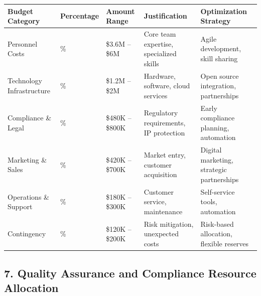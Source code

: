 \documentclass[
  letterpaper,
  DIV=11,
  numbers=noendperiod]{scrartcl}
\begin{document}
\begin{longtable}[]{@{}
  >{\raggedright\arraybackslash}p{}
  >{\raggedright\arraybackslash}p{}
  >{\raggedright\arraybackslash}p{}
  >{\raggedright\arraybackslash}p{}
  >{\raggedright\arraybackslash}p{}@{}}
\toprule\noalign{}
\begin{minipage}[b]{\linewidth}\raggedright
Budget Category
\end{minipage} & \begin{minipage}[b]{\linewidth}\raggedright
Percentage
\end{minipage} & \begin{minipage}[b]{\linewidth}\raggedright
Amount Range
\end{minipage} & \begin{minipage}[b]{\linewidth}\raggedright
Justification
\end{minipage} & \begin{minipage}[b]{\linewidth}\raggedright
Optimization Strategy
\end{minipage} \\
\midrule\noalign{}
\endhead
\bottomrule\noalign{}
\endlastfoot
Personnel Costs & 60\% & \$3.6M -- \$6M & Core team expertise,
specialized skills & Agile development, skill sharing \\
Technology Infrastructure & 20\% & \$1.2M -- \$2M & Hardware, software,
cloud services & Open source integration, partnerships \\
Compliance \& Legal & 8\% & \$480K -- \$800K & Regulatory requirements,
IP protection & Early compliance planning, automation \\
Marketing \& Sales & 7\% & \$420K -- \$700K & Market entry, customer
acquisition & Digital marketing, strategic partnerships \\
Operations \& Support & 3\% & \$180K -- \$300K & Customer service,
maintenance & Self-service tools, automation \\
Contingency & 2\% & \$120K -- \$200K & Risk mitigation, unexpected costs
& Risk-based allocation, flexible reserves \\
\end{longtable}

\subsection{7. Quality Assurance and Compliance Resource
Allocation}\label{quality-assurance-and-compliance-resource-allocation}
\end{document}
